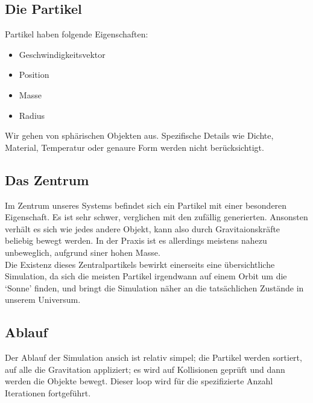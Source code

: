 
\subsection{Die Partikel}
Partikel haben folgende Eigenschaften:
\begin{itemize}
    \item Geschwindigkeitsvektor
    \item Position
    \item Masse
    \item Radius
\end{itemize}
Wir gehen von sphärischen Objekten aus. Spezifische Details wie Dichte,
Material, Temperatur oder genaure Form werden nicht berücksichtigt.

\subsection{Das Zentrum}
Im Zentrum unseres Systems befindet sich ein Partikel mit einer besonderen
Eigenschaft. Es ist sehr schwer, verglichen mit den zufällig generierten.
Ansonsten verhält es sich wie jedes andere Objekt, kann also durch Gravitaionskräfte
beliebig bewegt werden. In der Praxis ist es allerdings meistens nahezu unbeweglich,
aufgrund siner hohen Masse.\\
Die Existenz dieses Zentralpartikels bewirkt einerseits eine übersichtliche Simulation,
da sich die meisten Partikel irgendwann auf einem Orbit um die `Sonne' finden,
und bringt die Simulation näher an die tatsächlichen Zustände in unserem Universum.

\subsection{Ablauf}
Der Ablauf der Simulation ansich ist relativ simpel; die Partikel werden sortiert,
auf alle die Gravitation appliziert; es wird auf Kollisionen geprüft und dann werden
die Objekte bewegt. Dieser loop wird für die spezifizierte Anzahl Iterationen
fortgeführt.

